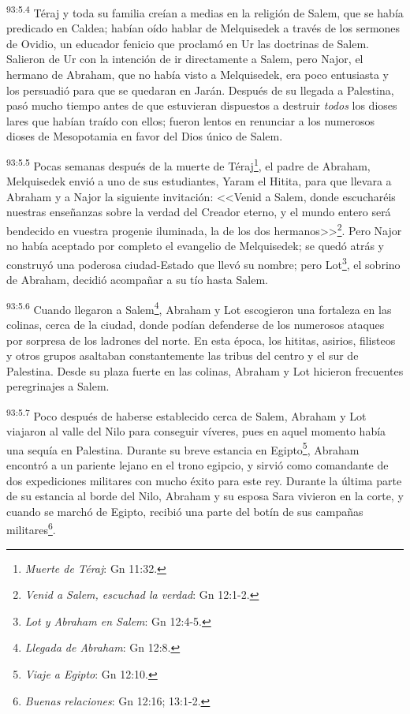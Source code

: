 \par
\textsuperscript{93:5.4} Téraj y toda su familia creían a medias en la religión de Salem, que se había predicado en Caldea; habían oído hablar de Melquisedek a través de los sermones de Ovidio, un educador fenicio que proclamó en Ur las doctrinas de Salem. Salieron de Ur con la intención de ir directamente a Salem, pero Najor, el hermano de Abraham, que no había visto a Melquisedek, era poco entusiasta y los persuadió para que se quedaran en Jarán. Después de su llegada a Palestina, pasó mucho tiempo antes de que estuvieran dispuestos a destruir \textit{todos} los dioses lares que habían traído con ellos; fueron lentos en renunciar a los numerosos dioses de Mesopotamia en favor del Dios único de Salem.

\par
\textsuperscript{93:5.5} Pocas semanas después de la muerte de Téraj\footnote{\textit{Muerte de Téraj}: Gn 11:32.}, el padre de Abraham, Melquisedek envió a uno de sus estudiantes, Yaram el Hitita, para que llevara a Abraham y a Najor la siguiente invitación: <<Venid a Salem, donde escucharéis nuestras enseñanzas sobre la verdad del Creador eterno, y el mundo entero será bendecido en vuestra progenie iluminada, la de los dos hermanos>>\footnote{\textit{Venid a Salem, escuchad la verdad}: Gn 12:1-2.}. Pero Najor no había aceptado por completo el evangelio de Melquisedek; se quedó atrás y construyó una poderosa ciudad-Estado que llevó su nombre; pero Lot\footnote{\textit{Lot y Abraham en Salem}: Gn 12:4-5.}, el sobrino de Abraham, decidió acompañar a su tío hasta Salem.

\par
\textsuperscript{93:5.6} Cuando llegaron a Salem\footnote{\textit{Llegada de Abraham}: Gn 12:8.}, Abraham y Lot escogieron una fortaleza en las colinas, cerca de la ciudad, donde podían defenderse de los numerosos ataques por sorpresa de los ladrones del norte. En esta época, los hititas, asirios, filisteos y otros grupos asaltaban constantemente las tribus del centro y el sur de Palestina. Desde su plaza fuerte en las colinas, Abraham y Lot hicieron frecuentes peregrinajes a Salem.

\par
\textsuperscript{93:5.7} Poco después de haberse establecido cerca de Salem, Abraham y Lot viajaron al valle del Nilo para conseguir víveres, pues en aquel momento había una sequía en Palestina. Durante su breve estancia en Egipto\footnote{\textit{Viaje a Egipto}: Gn 12:10.}, Abraham encontró a un pariente lejano en el trono egipcio, y sirvió como comandante de dos expediciones militares con mucho éxito para este rey. Durante la última parte de su estancia al borde del Nilo, Abraham y su esposa Sara vivieron en la corte, y cuando se marchó de Egipto, recibió una parte del botín de sus campañas militares\footnote{\textit{Buenas relaciones}: Gn 12:16; 13:1-2.}.

